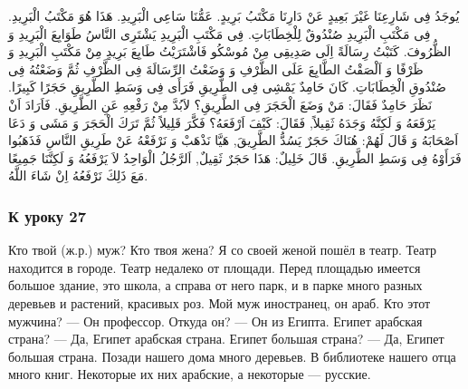 \documentclass[a5paper]{article}
\begin{document}
يُوجَدُ فِى شَارِعِنَا غَيْرَ بَعِيدٍ عَنْ دَارِنَا مَكْتَبُ بَرِيدٍ. عَمُّنَا سَاعِى الْبَرِيدِ. هَذَا هُوَ مَكْتَبُ الْبَرِيدِ. فِى مَكْتَبِ الْبَرِيدِ صُنْدُوقٌ لِلْخِطَابَاتِ. فِى مَكْتَبِ الْبَرِيدِ يَشْتَرِى النَّاسُ طَوَابِعَ الْبَرِيدِ وَ الظُّرُوفَ. كَتَبْتُ رِسَالَةً اِلَى صَدِيقِى مِنْ مُوسْكُو فَاشْتَرَيْتُ طَابِعَ بَرِيدٍ مِنْ مَكْتَبِ الْبَرِيدِ وَ ظَرْفًا وَ اَلْصَقْتُ الطَّابِعَ عَلَى الظَّرْفِ وَ وَضَعْتُ الرِّسَالَةَ فِى الظَّرْفِ ثُمَّ وَضَعْتُهُ فِى صُنْدُوقِ الْخِطَابَاتِ. كَانَ حَامِدٌ يَمْشِى فِى الطَّرِيقِ فَرَأَى فِى وَسَطِ الطَّرِيقِ حَجَرًا كَبِيرًا. نَظَرَ حَامِدٌ فَقَالَ: مَنْ وَضَعَ الْحَجَرَ فِى الطَّرِيقِ؟ لاَبُدَّ مِنْ رَفْعِهِ عَنِ الطَّرِيقِ. فَاَرَادَ اَنْ يَرْفَعَهُ وَ لَكِنَّهُ وَجَدَهُ ثَقِيلاً, فَقَالَ: كَيْفَ اَرْفَعَهُ؟ فَكَّرَ قَلِيلاً ثُمَّ تَرَكَ الْحَجَرَ وَ مَشَى وَ دَعَا اَصْحَابَهُ وَ قَالَ لَهُمْ: هُنَاكَ حَجَرٌ يَسُدُّ الطَّرِيقَ, هَيَّا نَذْهَبْ وَ نَرْفَعْهُ عَنْ طَرِيقِ النَّاسِ فَذَهَبُوا فَرَأَوْهُ فِى وَسَطِ الطَّرِيقِ. قَالَ خَلِيلٌ: هَذَا حَجَرٌ ثَقِيلٌ, اَلرَّجُلُ الْوَاحِدُ لاَ يَرْفَعُهُ وَ لَكِنَّنَا جَمِيعًا مَعَ ذَلِكَ نَرْفَعُهُ اِنْ شَاءَ اللَّهُ.

\subsubsection{К уроку 27}
Кто твой (ж.р.) муж? Кто твоя жена? Я со своей женой пошёл в театр. Театр находится в городе. Театр недалеко от площади. Перед площадью имеется большое здание, это школа, а справа от него парк, и в парке много разных деревьев и растений, красивых роз. Мой муж иностранец, он араб. Кто этот мужчина? — Он профессор. Откуда он? — Он из Египта. Египет арабская страна? — Да, Египет арабская страна. Египет большая страна? — Да, Египет большая страна. Позади нашего дома много деревьев. В библиотеке нашего отца много книг. Некоторые их них арабские, а некоторые — русские.
\end{document}

